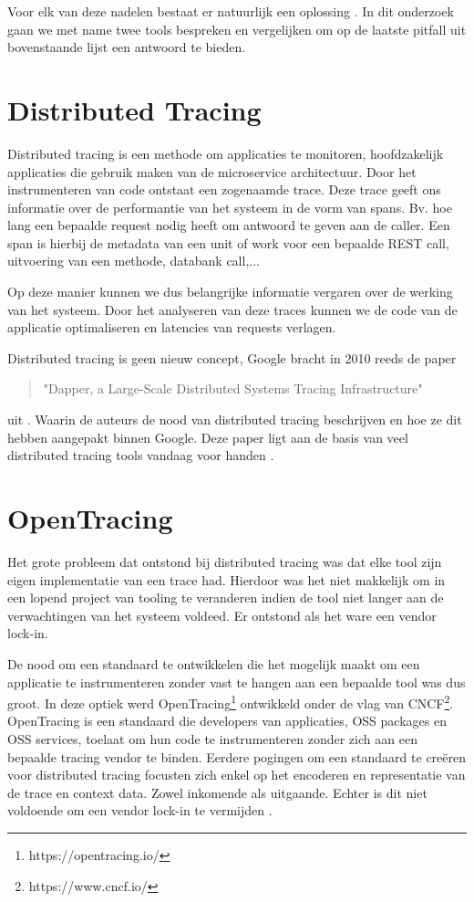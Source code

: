 Voor elk van deze nadelen bestaat er natuurlijk een oplossing \autocite{Hummel2018}. In dit onderzoek gaan we met name twee tools bespreken en vergelijken om op de laatste pitfall uit bovenstaande lijst een antwoord te bieden.

\section{Distributed Tracing}
Distributed tracing is een methode om applicaties te monitoren, hoofdzakelijk applicaties die gebruik maken van de microservice architectuur. Door het instrumenteren van code ontstaat een zogenaamde \gls{trace}. Deze \gls{trace} geeft ons informatie over de performantie van het systeem in de vorm van \gls{span}s. Bv. hoe lang een bepaalde request nodig heeft om antwoord te geven aan de caller. Een \gls{span} is hierbij de metadata van een unit of work voor een bepaalde \gls{REST} call, uitvoering van een methode, databank call,...

Op deze manier kunnen we dus belangrijke informatie vergaren over de werking van het systeem. Door het analyseren van deze \gls{trace}s kunnen we de code van de applicatie optimaliseren en latencies van requests verlagen.

Distributed tracing is geen nieuw concept, Google bracht in 2010 reeds de paper \begin{quotation}
	"Dapper, a Large-Scale Distributed Systems Tracing Infrastructure"
\end{quotation} uit \autocite{36356}. Waarin de auteurs de nood van distributed tracing beschrijven en hoe ze dit hebben aangepakt binnen Google. Deze paper ligt aan de basis van veel distributed tracing tools vandaag voor handen \autocite{Mace2017}.

\section{OpenTracing}
Het grote probleem dat ontstond bij distributed tracing was dat elke tool zijn eigen implementatie van een \gls{trace} had. Hierdoor was het niet makkelijk om in een lopend project van tooling te veranderen indien de tool niet langer aan de verwachtingen van het systeem voldeed. Er ontstond als het ware een vendor lock-in.

De nood om een standaard te ontwikkelen die het mogelijk maakt om een applicatie te instrumenteren zonder vast te hangen aan een bepaalde tool was dus groot. In deze optiek werd OpenTracing\footnote{https://opentracing.io/} ontwikkeld onder de vlag van \gls{CNCF}\footnote{https://www.cncf.io/}. OpenTracing is een standaard die developers van applicaties, \gls{OSS} packages en \gls{OSS} services, toelaat om hun code te instrumenteren zonder zich aan een bepaalde tracing vendor te binden. Eerdere pogingen om een standaard te creëren voor distributed tracing focusten zich enkel op het encoderen en representatie van de \gls{trace} en context data. Zowel inkomende als uitgaande. Echter is dit niet voldoende om een vendor lock-in te vermijden \autocite{Sigelman2016}.

